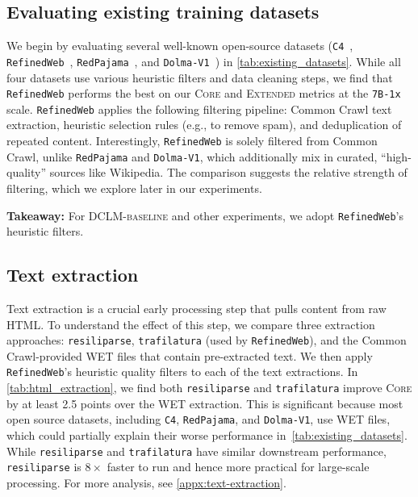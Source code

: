 \subsection{Evaluating existing training datasets}
\label{subsec:existing-datasets}

We begin by evaluating several well-known open-source datasets (\texttt{C4}~\citep{c4,c4_ai2}, \texttt{RefinedWeb}~\citep{refinedweb}, \texttt{RedPajama}~\citep{rpj}, and \texttt{Dolma-V1}~\citep{soldaini2024dolma}) in \ref{tab:existing_datasets}.
While all four datasets use various heuristic filters and data cleaning steps, we find that \texttt{RefinedWeb} performs the best on our \textsc{Core} and \textsc{Extended} metrics at the \texttt{7B-1x} scale.
\texttt{RefinedWeb} applies the following filtering pipeline: Common Crawl text extraction, heuristic selection rules (e.g., to remove spam), and deduplication of repeated content. Interestingly, \texttt{RefinedWeb} is solely filtered from Common Crawl, unlike \texttt{RedPajama} and \texttt{Dolma-V1}, which additionally mix in curated, ``high-quality'' sources like Wikipedia. The comparison suggests the relative strength of filtering, which we explore later in our experiments.

\begin{tcolorbox}[
    colback=blue!10,
    colframe=blue!50, boxrule=0.5pt, arc=0mm, left=5pt, right=5pt, top=2pt, bottom=2pt,
    fontupper={\fontsize{9.5pt}{11.75pt}\selectfont}
  ]
    \textbf{Takeaway:} For \textsc{DCLM-baseline} and other experiments, we adopt \texttt{RefinedWeb}'s heuristic filters.
  \end{tcolorbox}

\subsection{Text extraction}
\label{sec:text_extraction}

Text extraction is a crucial early processing step that pulls content from raw HTML. To understand the effect of this step, we compare three extraction approaches: \texttt{resiliparse}, \texttt{trafilatura} (used by \texttt{RefinedWeb}), and the Common Crawl-provided WET files that contain pre-extracted text. We then apply \texttt{RefinedWeb}'s heuristic quality filters to each of the text extractions. In \ref{tab:html_extraction}, we find both \texttt{resiliparse} and \texttt{trafilatura} improve \textsc{Core} by at least 2.5 points over the WET extraction. This is significant because most open source datasets, including \texttt{C4}, \texttt{RedPajama}, and \texttt{Dolma-V1}, use WET files, which could partially explain their worse performance in~\ref{tab:existing_datasets}.
While \texttt{resiliparse} and \texttt{trafilatura} have similar downstream performance, \texttt{resiliparse} is $8\times$ faster to run and hence more practical for large-scale processing. For more analysis, see \ref{appx:text-extraction}.

